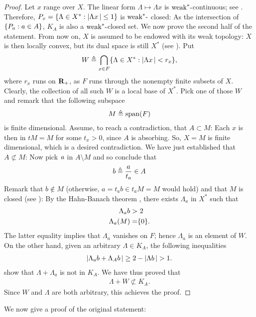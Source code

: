 \begin{proof}%
Let $x$ range over $X$. The linear form %
%
  $\Lambda \mapsto \Lambda x$ %
%
is $\text{weak}^\ast\text{-}$continuous; see . %
Therefore, %
%
  $P_x= \{\Lambda \in X^\ast: \left\lvert \Lambda x \,\right\rvert \leq 1\}$ %
%
is $\text{weak}^\ast\text{-}$ closed: %
As the intersection of $\{P_a: a\in A\}$, %
$K_A$ is also a $\text{weak}^\ast\text{-}$closed set. %
We now prove the second half of the statement. %
%
\newline\newline\noindent
%
From now on, $X$ is assumed to be endowed with its weak topology: %
$X$ is then locally convex, but its dual space is still %
%
  $X^\ast$ (see ). %
%
Put %
%
  \begin{align}
    W \triangleq \bigcap_{x\in F} \{\Lambda \in X^\ast: \left\lvert \Lambda x \,\right\rvert < r_x\}, 
  \end{align}
%
where $r_x$ runs on ${\mathbf R}_+$, %
as $F$ runs through the nonempty finite subsets of $X$. %
%
Clearly, the collection of all such $W$ is a local base of $X^\ast$. %
Pick one of those $W$ and remark that the following subspace %
%
  \begin{align}
    M \triangleq \text{span}(F)
  \end{align}
%
is finite dimensional. %
Assume, to reach a contradiction, that $A\subset M$: %
Each $x$ is then in $tM=M$ for some $t_x>0$, since $A$ is absorbing. %
So, $X=M$ is finite dimensional, which is a desired contradiction.
%
We have just established that $A\not\subset M$: %
Now pick $\mathit{a}$ in $A\setminus M$ and so conclude that %
%
  \begin{align}
    b\triangleq \frac{a}{t_a}\in A
  \end{align}
%
Remark that $b\notin M$ (otherwise, $a = t_a b \in t_a M=M$ would hold) %
and that $M$ is closed (see ): %
By the Hahn-Banach theorem , %
there exists $\Lambda_a$ in $X^\ast$ such that 
%
  \begin{align}
    \label{3.11. Polar_4.}\Lambda_a b    > & \,\,2 \\
    \label{3.11. Polar_4bis.}\Lambda_a (M) = & \{0\}.
  \end{align}
%
The latter equality implies that $\Lambda_a$ vanishes on $F$; %
hence $\Lambda_a$ is an element of $W$. %
On the other hand, given an arbitrary $\Lambda \in K_A$, %
the following inequalities  %
%
  \begin{align}
    \left\lvert \Lambda_a b + \Lambda_A b \,\right\rvert 
      \geq 
    2 - \left\lvert \Lambda b \,\right\rvert 
      >
    1.
  \end{align}
%
show that $\Lambda + \Lambda_a$ is not in $K_A$. %
%
We have thus proved that
%
  \begin{align}
  \Lambda + W\not\subset K_A.
  \end{align}
%
Since $W$ and $\Lambda$ are both arbitrary, this achieves the proof. %
\end{proof}
%
\noindent
We now give a proof of the original statement:
%
